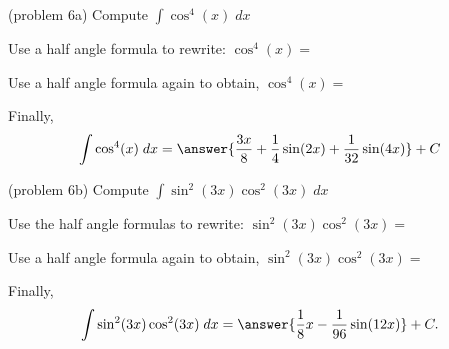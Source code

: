 \documentclass{ximera}
\begin{document}
\begin{problem}(problem 6a)
Compute $\displaystyle{\int \cos^4(x) \; dx}$


Use a half angle formula to rewrite: $\cos^4(x)=$

\begin{multipleChoice}
\end{multipleChoice}

Use a half angle formula again to obtain, $\cos^4(x) = $

\begin{multipleChoice}
\end{multipleChoice}

Finally,
\[
\int \cos^4(x) \; dx = \answer{\frac{3x}{8} +\frac14 \sin(2x) + \frac{1}{32}\sin(4x)} + C
\]
\end{problem}



\begin{problem}(problem 6b)
Compute $\displaystyle{\int \sin^2(3x)\cos^2(3x) \; dx}$


Use the half angle formulas to rewrite: $\sin^2(3x) \cos^2(3x)=$

\begin{multipleChoice}
\end{multipleChoice}

Use a half angle formula again to obtain, $\sin^2(3x) \cos^2(3x)=$

\begin{multipleChoice}
\end{multipleChoice}

Finally,
\[
\int \sin^2(3x)\cos^2(3x) \; dx = \answer{\frac18 x - \frac{1}{96} \sin(12x)} + C.
\]

\end{problem}


\end{document}
